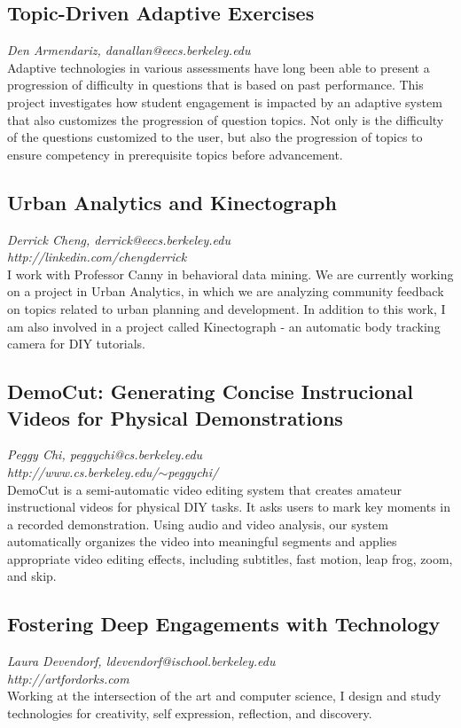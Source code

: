 \documentclass[foldmark,10pt,a4paper,notumble]{leaflet}
\begin{document}
\subsection{Topic-Driven Adaptive Exercises}
\emph{Den Armendariz, danallan@eecs.berkeley.edu}\\
Adaptive technologies in various assessments have long been
able to present a progression of difficulty in questions that is based
on past performance. This project investigates how student engagement
is impacted by an adaptive system that also customizes the progression
of question topics. Not only is the difficulty of the questions
customized to the user, but also the progression of topics to ensure
competency in prerequisite topics before advancement.

\subsection{Urban Analytics and Kinectograph}
\emph{Derrick Cheng, derrick@eecs.berkeley.edu}\\
\emph{http://linkedin.com/chengderrick}\\
I work with Professor Canny in behavioral data mining. We are currently working on a project in Urban Analytics, in which we are analyzing community feedback on topics related to urban planning and development. 
In addition to this work, I am also involved in a project called Kinectograph - an automatic body tracking camera for DIY tutorials.

\subsection{DemoCut: Generating Concise Instrucional Videos for Physical Demonstrations}
\emph{Peggy Chi, peggychi@cs.berkeley.edu}\\
\emph{http://www.cs.berkeley.edu/$\sim$peggychi/}\\
DemoCut is a semi-automatic video editing system that creates amateur instructional videos for physical DIY tasks. It asks users to mark key moments in a recorded demonstration. Using audio and video analysis, our system automatically organizes the video into meaningful segments and applies appropriate video editing effects, including subtitles, fast motion, leap frog, zoom, and skip.

\subsection{Fostering Deep Engagements with Technology}
\emph{Laura Devendorf, ldevendorf@ischool.berkeley.edu}\\
\emph{http://artfordorks.com}\\
Working at the intersection of the art and computer science, I design and study technologies for creativity, self expression, reflection, and discovery.
\end{document}
